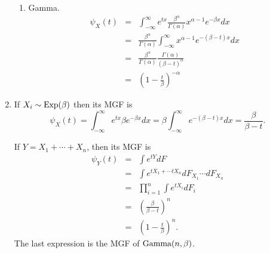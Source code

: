 \documentclass{article}
\begin{document}
\begin{enumerate}
\begin{enumerate}
\item Gamma. 
\begin{eqnarray*}
\psi_X(t) &=& \int_{-\infty}^\infty e^{tx}\frac{\beta^\alpha}{\Gamma(\alpha)}
x^{\alpha - 1}e^{-\beta x}dx \\
 &=& \frac{\beta^\alpha}{\Gamma(\alpha)}\int_{-\infty}^\infty x^{\alpha - 1}
e^{-(\beta-t) x}dx \\
 &=& \frac{\beta^\alpha}{\Gamma(\alpha)}\frac{\Gamma(\alpha)}{(\beta - t)^\alpha} \\
 &=& \left(1 - \frac{t}{\beta}\right)^{-\alpha}
\end{eqnarray*}
\end{enumerate}

\item If $X_i \sim \text{Exp}(\beta)$ then its MGF is
\[
\psi_X(t) = \int_{-\infty}^\infty e^{tx}\beta e^{-\beta x}dx = \beta
\int_{-\infty}^\infty e^{-(\beta - t)x}dx = \frac{\beta}{\beta - t}.
\]

If $Y = X_1 + \cdots + X_n$, then its MGF is
\begin{eqnarray*}
\psi_Y(t) &=& \int e^{tY}dF \\
 &=& \int e^{tX_1 + \cdots tX_n} dF_{X_1}\cdots dF_{X_n} \\
 &=& \prod_{i=1}^n \int e^{tX_i}dF_i \\
 &=& \left(\frac{\beta}{\beta - t}\right)^n \\
 &= & \left(1 - \frac{t}{\beta}\right)^n.
\end{eqnarray*}
The last expression is the MGF of $\text{Gamma}(n, \beta)$.
\end{enumerate}
\end{document}
